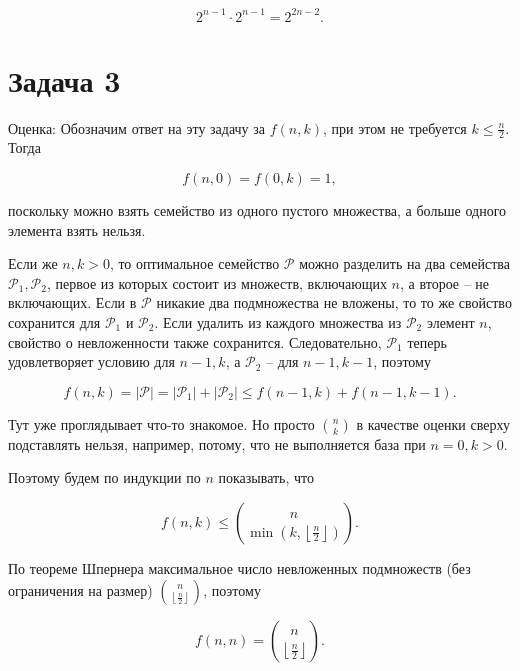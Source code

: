 \documentclass{article}
\newcommand{\abs}[1]{\left\lvert#1\right\rvert}
\newcommand{\floor}[1]{\left\lfloor#1\right\rfloor}
\begin{document}
	\begin{equation*}
		2^{n-1} \cdot 2^{n-1} = 2^{2n-2}.
	\end{equation*}


	\section*{Задача 3}

	Оценка: Обозначим ответ на эту задачу за $f(n, k)$, при этом не требуется $k \le \frac{n}{2}$. Тогда

	\begin{equation*}
		f(n, 0) = f(0, k) = 1,
	\end{equation*}

	поскольку можно взять семейство из одного пустого множества, а больше одного элемента взять нельзя.

	Если же $n, k > 0$, то оптимальное семейство $\mathcal{P}$ можно разделить на два семейства $\mathcal{P}_1, \mathcal{P}_2$, первое из которых состоит из множеств, включающих $n$, а второе -- не включающих. Если в $\mathcal{P}$ никакие два подмножества не вложены, то то же свойство сохранится для $\mathcal{P}_1$ и $\mathcal{P}_2$. Если удалить из каждого множества из $\mathcal{P}_2$ элемент $n$, свойство о невложенности также сохранится. Следовательно, $\mathcal{P}_1$ теперь удовлетворяет условию для $n-1, k$, а $\mathcal{P}_2$ -- для $n-1, k-1$, поэтому

	\begin{equation*}
		f(n, k) = \abs{\mathcal{P}} = \abs{\mathcal{P}_1} + \abs{\mathcal{P}_2} \le f(n-1, k) + f(n-1, k-1).
	\end{equation*}

	Тут уже проглядывает что-то знакомое. Но просто $\binom{n}{k}$ в качестве оценки сверху подставлять нельзя, например, потому, что не выполняется база при $n = 0, k > 0$.

	Поэтому будем по индукции по $n$ показывать, что

	\begin{equation*}
		f(n, k) \le \binom{n}{\min(k, \floor{\frac{n}{2}})}.
	\end{equation*}

	По теореме Шпернера максимальное число невложенных подмножеств (без ограничения на размер) $\binom{n}{\floor{\frac{n}{2}}}$, поэтому

	\begin{equation*}
		f(n, n) = \binom{n}{\floor{\frac{n}{2}}}.
	\end{equation*}
\end{document}
